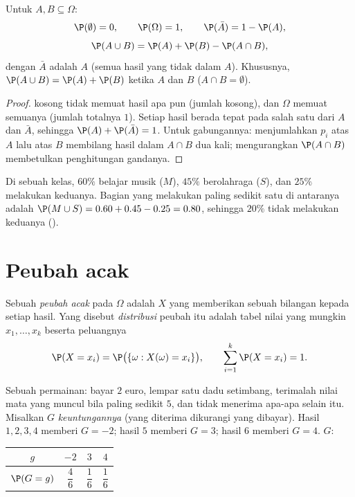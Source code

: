 \begin{proposition}\label{prop:g11:prob:rules}
Untuk  $A, B \subseteq \Omega$:
\[
\P(\emptyset) = 0, \qquad \P(\Omega) = 1, \qquad
\P(\bar A) = 1 - \P(A),
\]
\[
\P(A \cup B) = \P(A) + \P(B) - \P(A \cap B),
\]
dengan $\bar A$ adalah \emph{} $A$ (semua hasil yang tidak dalam $A$).
Khususnya, $\P(A \cup B) = \P(A) + \P(B)$ ketika $A$ dan $B$
\emph{} ($A \cap B = \emptyset$).
\end{proposition}

\begin{proof}
 kosong tidak memuat hasil apa pun (jumlah kosong), dan $\Omega$ memuat
semuanya (jumlah totalnya $1$). Setiap hasil berada tepat pada salah satu dari
$A$ dan $\bar A$, sehingga $\P(A) + \P(\bar A) = 1$. Untuk gabungannya:
menjumlahkan $p_i$ atas $A$ lalu atas $B$ membilang hasil dalam $A \cap B$ dua
kali; mengurangkan $\P(A \cap B)$ membetulkan penghitungan gandanya.
\end{proof}

\begin{example}
Di sebuah kelas, $60\%$ belajar musik ($M$), $45\%$ berolahraga ($S$), dan
$25\%$ melakukan keduanya. Bagian yang melakukan paling sedikit satu di
antaranya adalah $\P(M \cup S) = 0.60 + 0.45 - 0.25 = 0.80$, sehingga $20\%$
tidak melakukan keduanya ().
\end{example}

\section{Peubah acak}

\begin{definition}\label{def:g11:prob:rv}
Sebuah \emph{peubah acak} pada $\Omega$ adalah 
$X$ yang memberikan sebuah bilangan kepada setiap hasil.
Yang disebut \emph{distribusi} peubah itu adalah tabel nilai yang mungkin
$x_1, \dots, x_k$ beserta peluangnya
\[
\P(X = x_i) = \P\bigl(\{\omega : X(\omega) = x_i\}\bigr),
\qquad
\sum_{i=1}^k \P(X = x_i) = 1 .
\]
\end{definition}

\begin{example}\label{ex:g11:prob:game}
Sebuah permainan: bayar $2$ euro, lempar satu dadu setimbang, terimalah nilai
mata yang muncul bila paling sedikit $5$, dan tidak menerima apa-apa selain
itu. Misalkan $G$ \emph{keuntungannya} (yang diterima dikurangi yang dibayar).
Hasil $1, 2, 3, 4$ memberi $G = -2$; hasil $5$
memberi $G = 3$; hasil $6$ memberi $G = 4$.  $G$:
\begin{center}
\begin{tabular}{c|ccc}
$g$ & $-2$ & $3$ & $4$\\
\hline\rule{0pt}{11pt}%
$\P(G = g)$ & $\dfrac46$ & $\dfrac16$ & $\dfrac16$
\end{tabular}
\end{center}
\end{example}

